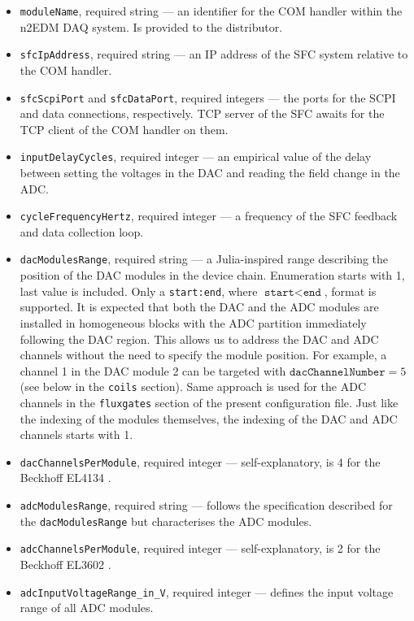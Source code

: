 \begin{itemize}
	\item \texttt{moduleName}, required string --- an identifier for the COM handler within the n2EDM DAQ system. Is provided to the distributor.
	\item \texttt{sfcIpAddress}, required string --- an IP address of the SFC system relative to the COM handler.
	\item \texttt{sfcScpiPort} and \texttt{sfcDataPort}, required integers --- the ports for the SCPI and data connections, respectively. TCP server of the SFC awaits for the TCP client of the COM handler on them.
	\item \texttt{inputDelayCycles}, required integer --- an empirical value of the delay between setting the voltages in the DAC and reading the field change in the ADC.
	\item \texttt{cycleFrequencyHertz}, required integer --- a frequency of the SFC feedback and data collection loop.
	\item \texttt{dacModulesRange}, required string --- a Julia-inspired \cite{Juliacontributors} range describing the position of the DAC modules in the device chain. Enumeration starts with 1, last value is included. Only a \texttt{start:end}, where $\texttt{start} < \texttt{end}$, format is supported. It is expected that both the DAC and the ADC modules are installed in homogeneous blocks with the ADC partition immediately following the DAC region. This allows us to address the DAC and ADC channels without the need to specify the module position. For example, a channel 1 in the DAC module 2 can be targeted with $\texttt{dacChannelNumber} = 5$ (see below in the \texttt{coils} section). Same approach is used for the ADC channels in the \texttt{fluxgates} section of the present configuration file. Just like the indexing of the modules themselves, the indexing of the DAC and ADC channels starts with 1.
	\item \texttt{dacChannelsPerModule}, required integer --- self-explanatory, is 4 for the Beckhoff EL4134 \cite{BeckhoffDAC2019}.
	\item \texttt{adcModulesRange}, required string --- follows the specification described for the \texttt{dacModulesRange} but characterises the ADC modules. 
	\item \texttt{adcChannelsPerModule}, required integer --- self-explanatory, is 2 for the Beckhoff EL3602 \cite{BeckhoffADC2019}.
	\item \texttt{adcInputVoltageRange\_in\_V}, required integer --- defines the input voltage range of all ADC modules.

\end{itemize}
